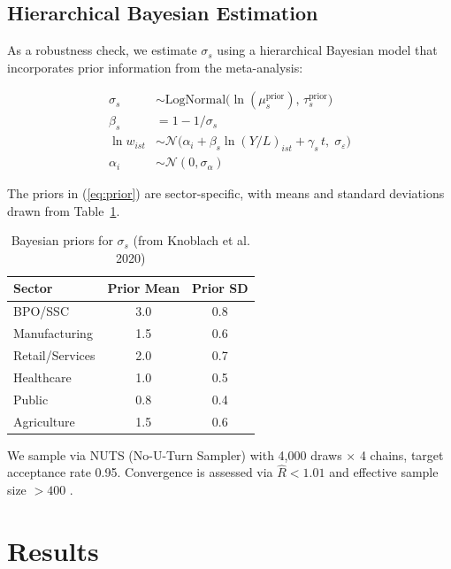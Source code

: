 \documentclass[11pt,a4paper]{article}
\begin{document}
\subsection{Hierarchical Bayesian Estimation}

As a robustness check, we estimate $\sigma_s$ using a hierarchical Bayesian model that incorporates prior information from the \autocite{knoblach2020what} meta-analysis:

\begin{align}
\sigma_s &\sim \text{LogNormal}\big(\ln(\mu_s^{\text{prior}}), \, \tau_s^{\text{prior}}\big) \label{eq:prior} \\
\beta_s &= 1 - 1/\sigma_s \\
\ln w_{ist} &\sim \mathcal{N}\big(\alpha_i + \beta_s \ln(Y/L)_{ist} + \gamma_s \, t, \; \sigma_\varepsilon\big) \\
\alpha_i &\sim \mathcal{N}(0, \sigma_\alpha) \label{eq:hierarchical}
\end{align}

The priors in (\ref{eq:prior}) are sector-specific, with means and standard deviations drawn from Table~\ref{tab:priors}.

\begin{table}[H]
\centering
\caption{Bayesian priors for $\sigma_s$ (from Knoblach et al. 2020)}
\label{tab:priors}
\begin{tabular}{lcc}
\toprule
\textbf{Sector} & \textbf{Prior Mean} & \textbf{Prior SD} \\
\midrule
BPO/SSC         & 3.0 & 0.8 \\
Manufacturing   & 1.5 & 0.6 \\
Retail/Services & 2.0 & 0.7 \\
Healthcare      & 1.0 & 0.5 \\
Public          & 0.8 & 0.4 \\
Agriculture     & 1.5 & 0.6 \\
\bottomrule
\end{tabular}
\end{table}

We sample via NUTS (No-U-Turn Sampler) with 4,000 draws $\times$ 4 chains, target acceptance rate 0.95.
Convergence is assessed via $\hat{R} < 1.01$ and effective sample size $> 400$ \autocite{gelman2006prior}.


\section{Results}
\label{sec:results}
\end{document}
